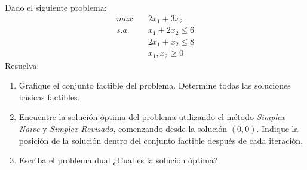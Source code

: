Dado el siguiente problema:
\begin{align*}
max \quad & 2x_1 + 3x_2 \\
s.a.  \quad & x_1 + 2x_2 \leq 6 \\
&2x_1 + x_2 \leq 8 \\
&x_1, x_2 \geq 0
\end{align*}
Resuelva:
\begin{enumerate}
    \item Grafique el conjunto factible del problema. Determine todas las soluciones básicas  factibles.

    \item Encuentre la solución óptima del problema utilizando el método \textit{Simplex Naive} y \textit{Simplex Revisado}, comenzando desde la solución \( (0, 0) \). Indique la posición de la solución dentro del conjunto factible después de cada iteración.

    \item Escriba el problema dual ¿Cual es la solución óptima?
\end{enumerate}

